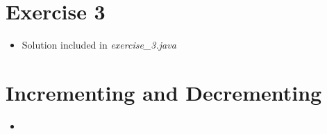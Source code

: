 \documentclass[12pt]{article}
\begin{document}
\bigskip

\section{Exercise 3}

\bigskip

\begin{itemize}
    \item Solution included in \textit{exercise\_3.java}
\end{itemize}

\bigskip

\section{Incrementing and Decrementing}

\bigskip

\begin{itemize}
    \item
\end{itemize}
\end{document}
